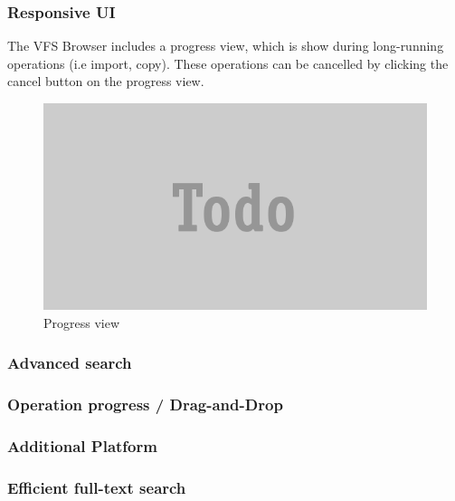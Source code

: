\documentclass[JCDReport.tex]{subfiles}
\begin{document}
\subsubsection{Responsive UI}
The VFS Browser includes a progress view, which is show during long-running operations (i.e import, copy). These operations can be cancelled by clicking the cancel button on the progress view.
\begin{figure}[h!]
  \centering
  \includegraphics[scale=0.35]{Images/todo.png} 
  \caption{Progress view}
\end{figure}

\subsubsection{Advanced search}

\subsubsection{Operation progress / Drag-and-Drop}

\subsubsection{Additional Platform}

\subsubsection{Efficient full-text search}
\end{document}
